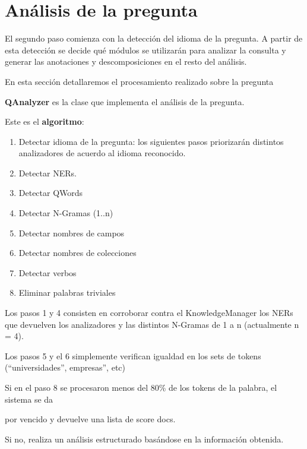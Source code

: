 \bigskip

\section{An\'alisis de la pregunta}

El segundo paso comienza con la detecci\'on del idioma de la pregunta. A
partir de esta detecci\'on se decide qu\'e m\'odulos se utilizar\'an
para analizar la consulta y generar las anotaciones y descomposiciones
en el resto del an\'alisis.

En esta secci\'on detallaremos el procesamiento realizado sobre la
pregunta


\bigskip

\textbf{QAnalyzer} es la clase que implementa el an\'alisis de la
pregunta.

Este es el\textbf{ algoritmo}:


\begin{enumerate}
\item Detectar idioma de la pregunta: los siguientes pasos priorizar\'an
distintos analizadores de acuerdo al idioma reconocido. 
\item Detectar NERs. 
\item Detectar QWords
\item Detectar N-Gramas (1..n)
\item Detectar nombres de campos
\item Detectar nombres de colecciones
\item Detectar verbos
\item Eliminar palabras triviales
\end{enumerate}

Los pasos 1 y 4 consisten en corroborar contra el KnowledgeManager los
NERs que devuelven los analizadores y las distintos N-Gramas de 1 a n
(actualmente n = 4). 


\bigskip

Los pasos 5 y el 6 simplemente verifican igualdad en los sets de tokens
({\textquotedblleft}universidades{\textquotedblright},
empresas{\textquotedblright}, etc)


\bigskip

Si en el paso 8 se procesaron menos del 80\% de los tokens de la
palabra, el sistema se da 

por vencido y devuelve una lista de score docs.

Si no, realiza un an\'alisis estructurado bas\'andose en la
informaci\'on obtenida.


\bigskip

